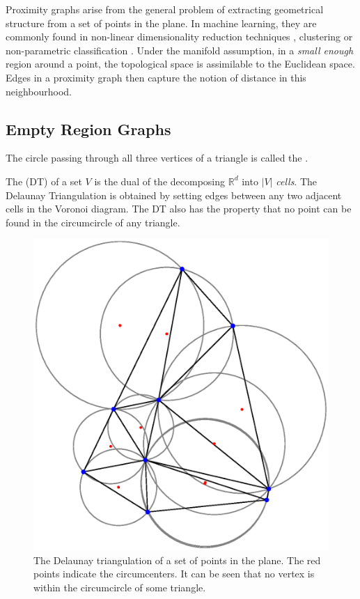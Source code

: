 Proximity graphs arise from the general problem of extracting geometrical structure from a set of points in the plane. In machine learning, they are commonly found in non-linear dimensionality reduction techniques \parencite{Tenenbaum2000, Roweis2000}, clustering \parencite{Luxburg2007} or non-parametric classification \parencite{Toussaint2012}. Under the manifold assumption, in a \textit{small enough} region around a point, the topological space is assimilable to the Euclidean space. Edges in a proximity graph then capture the notion of distance in this neighbourhood. 

\subsection{Empty Region Graphs}

\begin{defn}
The circle passing through all three vertices of a triangle is called the .
\end{defn}

\begin{defn}
The  (DT) of a set $V$ is the dual of the  decomposing $\mathbb{R}^d$ into $|V|$ \textit{cells}. The Delaunay Triangulation is obtained by setting edges between any two adjacent cells in the Voronoi diagram. The DT also has the property that no point can be found in the circumcircle of any triangle. 
\end{defn}

\begin{figure}
\centering
\includegraphics[scale=0.5]{fig/Delaunay-circle.eps}
\caption{The Delaunay triangulation of a set of points in the plane. The red points indicate the circumcenters. It can be seen that no vertex is within the circumcircle of some triangle.}
\label{fig:delaunay}
\end{figure}

